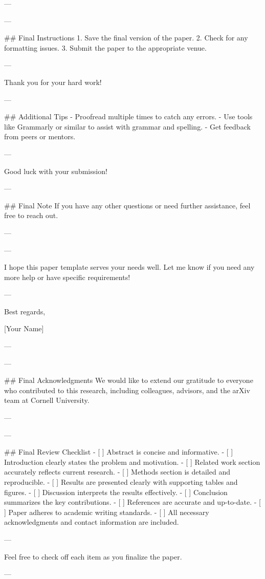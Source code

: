 --- 

---

## Final Instructions
1. Save the final version of the paper.
2. Check for any formatting issues.
3. Submit the paper to the appropriate venue.

--- 

Thank you for your hard work! 

--- 

## Additional Tips
- Proofread multiple times to catch any errors.
- Use tools like Grammarly or similar to assist with grammar and spelling.
- Get feedback from peers or mentors.

--- 

Good luck with your submission! 

--- 

## Final Note
If you have any other questions or need further assistance, feel free to reach out. 

--- 

---

I hope this paper template serves your needs well. Let me know if you need any more help or have specific requirements! 

--- 

Best regards, 

[Your Name] 

--- 

---

## Final Acknowledgments
We would like to extend our gratitude to everyone who contributed to this research, including colleagues, advisors, and the arXiv team at Cornell University. 

--- 

---

## Final Review Checklist
- [ ] Abstract is concise and informative.
- [ ] Introduction clearly states the problem and motivation.
- [ ] Related work section accurately reflects current research.
- [ ] Methods section is detailed and reproducible.
- [ ] Results are presented clearly with supporting tables and figures.
- [ ] Discussion interprets the results effectively.
- [ ] Conclusion summarizes the key contributions.
- [ ] References are accurate and up-to-date.
- [ ] Paper adheres to academic writing standards.
- [ ] All necessary acknowledgments and contact information are included.

--- 

Feel free to check off each item as you finalize the paper. 

--- 

